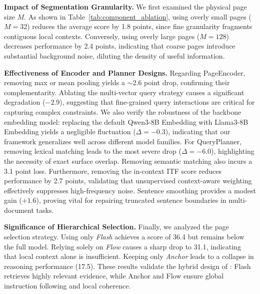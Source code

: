 \documentclass[11pt]{article}
\newcommand{\ours}{\text{BEAVER}\xspace}
\begin{document}
\textbf{Impact of Segmentation Granularity.} We first examined the physical page size $M$. As shown in Table~\ref{tab:component_ablation}, using overly small pages ($M=32$) reduces the average score by 1.8 points, since fine granularity fragments contiguous local contexts. Conversely, using overly large pages ($M=128$) decreases performance by 2.4 points, indicating that coarse pages introduce substantial background noise, diluting the density of useful information.

\textbf{Effectiveness of Encoder and Planner Designs.} Regarding PageEncoder, removing max or mean pooling yields a $\sim$2.6 point drop, confirming their complementarity. Ablating the multi-vector query strategy causes a significant degradation ($-2.9$), suggesting that fine-grained query interactions are critical for capturing complex constraints. We also verify the robustness of the backbone embedding model: replacing the default Qwen3-8B Embedding with Llama3-8B Embedding yields a negligible fluctuation ($\Delta=-0.3$), indicating that our framework generalizes well across different model families. For QueryPlanner, removing lexical matching leads to the most severe drop ($\Delta=-6.0$), highlighting the necessity of exact surface overlap. Removing semantic matching also incurs a 3.1 point loss. Furthermore, removing the in-context ITF score reduces performance by 2.7 points, validating that unsupervised context-aware weighting effectively suppresses high-frequency noise. Sentence smoothing provides a modest gain ($+1.6$), proving vital for repairing truncated sentence boundaries in multi-document tasks.

\textbf{Significance of Hierarchical Selection.} Finally, we analyzed the page selection strategy. Using only \textit{Flash} achieves a score of 36.4 but remains below the full model. Relying solely on \textit{Flow} causes a sharp drop to 31.1, indicating that local context alone is insufficient. Keeping only \textit{Anchor} leads to a collapse in reasoning performance (17.5). These results validate the hybrid design of \ours: Flash retrieves highly relevant evidence, while Anchor and Flow ensure global instruction following and local coherence.
\end{document}
